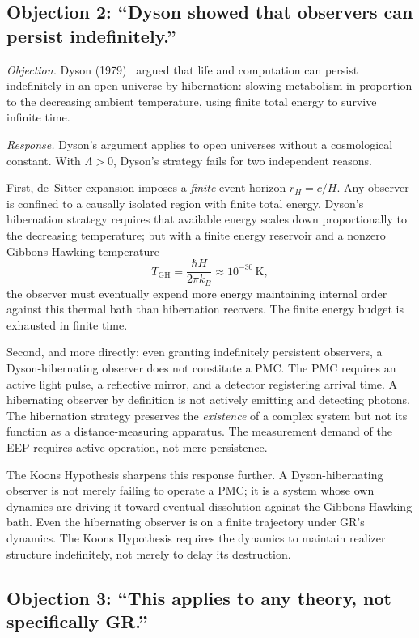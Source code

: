 \documentclass[11pt,a4paper]{article}
\begin{document}
\subsection{Objection 2: ``Dyson showed that observers can persist indefinitely.''}

\emph{Objection.} Dyson (1979)~\cite{dyson1979} argued that life and computation can
persist indefinitely in an open universe by hibernation: slowing metabolism in
proportion to the decreasing ambient temperature, using finite total energy to survive
infinite time.

\emph{Response.} Dyson's argument applies to open universes without a cosmological
constant. With $\Lambda > 0$, Dyson's strategy fails for two independent reasons.

First, de~Sitter expansion imposes a \emph{finite} event horizon $r_H = c/H$. Any
observer is confined to a causally isolated region with finite total energy. Dyson's
hibernation strategy requires that available energy scales down proportionally to the
decreasing temperature; but with a finite energy reservoir and a nonzero Gibbons-Hawking
temperature~\cite{gibbons1977}
\[
T_{\mathrm{GH}} = \frac{\hbar H}{2\pi k_B} \approx 10^{-30}\,\mathrm{K},
\]
the observer must eventually expend more energy maintaining internal order against this
thermal bath than hibernation recovers. The finite energy budget is exhausted in
finite time.

Second, and more directly: even granting indefinitely persistent observers, a
Dyson-hibernating observer does not constitute a PMC. The PMC requires an active light
pulse, a reflective mirror, and a detector registering arrival time. A hibernating
observer by definition is not actively emitting and detecting photons. The hibernation
strategy preserves the \emph{existence} of a complex system but not its function as a
distance-measuring apparatus. The measurement demand of the EEP requires active
operation, not mere persistence.

The Koons Hypothesis sharpens this response further. A Dyson-hibernating observer is
not merely failing to operate a PMC; it is a system whose own dynamics are driving it
toward eventual dissolution against the Gibbons-Hawking bath. Even the hibernating
observer is on a finite trajectory under GR's dynamics. The Koons Hypothesis requires
the dynamics to maintain realizer structure indefinitely, not merely to delay its
destruction.

\subsection{Objection 3: ``This applies to any theory, not specifically GR.''}
\end{document}
